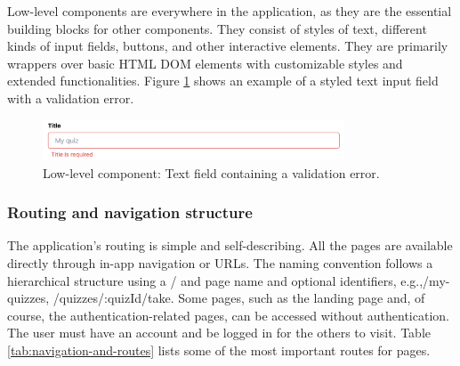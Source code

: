 Low-level components are everywhere in the application, as they are the essential building blocks for other components. They consist of styles of text, different kinds of input fields, buttons, and other interactive elements. They are primarily wrappers over basic HTML DOM elements with customizable styles and extended functionalities. Figure \ref{fig:low-level-component} shows an example of a styled text input field with a validation error.

\begin{figure}[H]
    \centering
    \includegraphics[width=0.8\textwidth, keepaspectratio]{figures/low-level-component.png}
    \caption{Low-level component: Text field containing a validation error.}
    \label{fig:low-level-component}
\end{figure}

\subsubsection{Routing and navigation structure}

The application's routing is simple and self-describing. All the pages are available directly through in-app navigation or URLs. The naming convention follows a hierarchical structure using a / and page name and optional identifiers, e.g.,/my-quizzes, /quizzes/:quizId/take. Some pages, such as the landing page and, of course, the authentication-related pages, can be accessed without authentication. The user must have an account and be logged in for the others to visit. Table \ref{tab:navigation-and-routes} lists some of the most important routes for pages.

